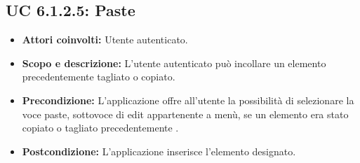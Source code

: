\subsection{UC 6.1.2.5: Paste}
\begin{itemize}
		\item \textbf{Attori coinvolti:} Utente autenticato. \\
		\item \textbf{Scopo e descrizione:} L'utente autenticato può incollare un elemento precedentemente tagliato o copiato. \\
		\item \textbf{Precondizione:} L'applicazione offre all'utente la possibilità di selezionare la voce paste, sottovoce di edit appartenente a menù, se un elemento era stato copiato o tagliato precedentemente . \\
		\item \textbf{Postcondizione:} L'applicazione inserisce l'elemento designato. \\
\end{itemize}